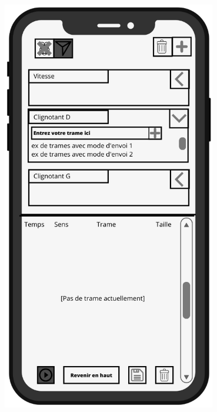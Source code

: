 \begin{minipage}{0.5\linewidth}
    \centering
    \includegraphics[width=0.7\textwidth]{sections/3_Exigences_specifiques/1_IHM/ihm/ecranPrincipalNonCo.png}
    \captionsetup{justification=centering}
    \label{ecran_principal_non_connecte}
\end{minipage}\hfill
